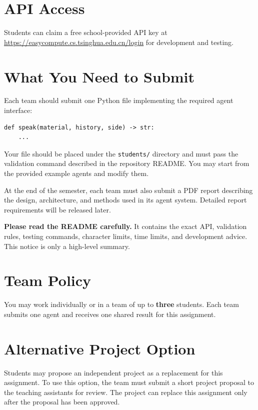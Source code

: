 \documentclass[11pt]{article}
\begin{document}
\section*{API Access}

Students can claim a free school-provided API key at \url{https://easycompute.cs.tsinghua.edu.cn/login} for development and testing.

\section*{What You Need to Submit}

Each team should submit one Python file implementing the required agent interface:

\begin{verbatim}
def speak(material, history, side) -> str:
    ...
\end{verbatim}

Your file should be placed under the \texttt{students/} directory and must pass the validation command described in the repository README. You may start from the provided example agents and modify them.

At the end of the semester, each team must also submit a PDF report describing the design, architecture, and methods used in its agent system. Detailed report requirements will be released later.

\textbf{Please read the README carefully.} It contains the exact API, validation rules, testing commands, character limits, time limits, and development advice. This notice is only a high-level summary.

\section*{Team Policy}

You may work individually or in a team of up to \textbf{three} students. Each team submits one agent and receives one shared result for this assignment.

\section*{Alternative Project Option}

Students may propose an independent project as a replacement for this assignment. To use this option, the team must submit a short project proposal to the teaching assistants for review. The project can replace this assignment only after the proposal has been approved.
\end{document}
